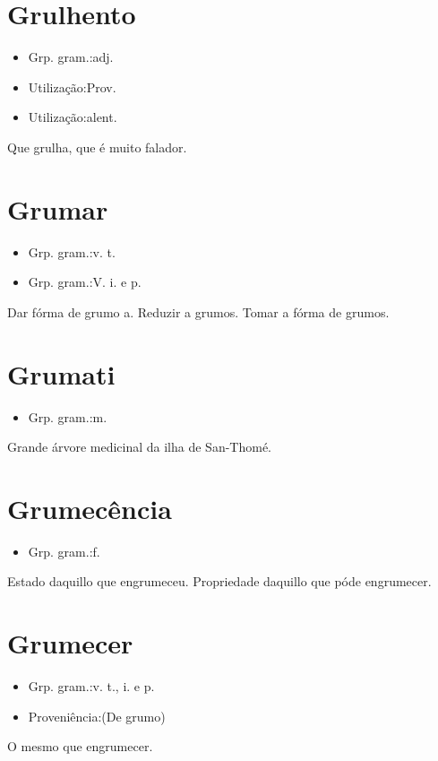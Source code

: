 \section{Grulhento}
\begin{itemize}
\item {Grp. gram.:adj.}
\end{itemize}
\begin{itemize}
\item {Utilização:Prov.}
\end{itemize}
\begin{itemize}
\item {Utilização:alent.}
\end{itemize}
Que grulha, que é muito falador.
\section{Grumar}
\begin{itemize}
\item {Grp. gram.:v. t.}
\end{itemize}
\begin{itemize}
\item {Grp. gram.:V. i.  e  p.}
\end{itemize}
Dar fórma de grumo a.
Reduzir a grumos.
Tomar a fórma de grumos.
\section{Grumati}
\begin{itemize}
\item {Grp. gram.:m.}
\end{itemize}
Grande árvore medicinal da ilha de San-Thomé.
\section{Grumecência}
\begin{itemize}
\item {Grp. gram.:f.}
\end{itemize}
Estado daquillo que engrumeceu.
Propriedade daquillo que póde engrumecer.
\section{Grumecer}
\begin{itemize}
\item {Grp. gram.:v. t., i.  e  p.}
\end{itemize}
\begin{itemize}
\item {Proveniência:(De \textunderscore grumo\textunderscore )}
\end{itemize}
O mesmo que \textunderscore engrumecer\textunderscore .
